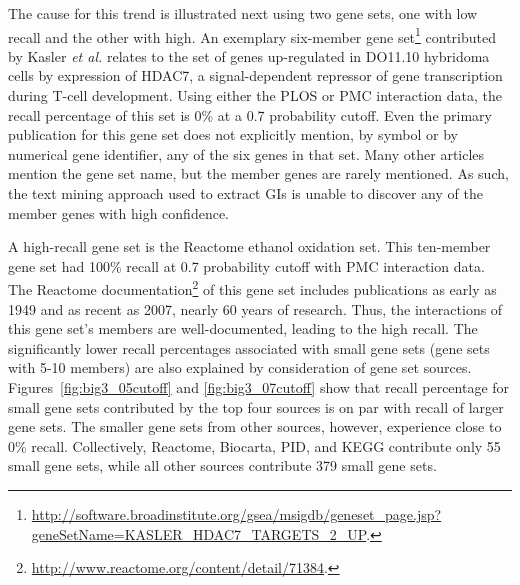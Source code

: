 \documentclass{ws-procs11x85}
\begin{document}
The cause for this trend is illustrated next using two gene sets, one with low recall and the other with high. An exemplary six-member gene set\footnote{\url{http://software.broadinstitute.org/gsea/msigdb/geneset\_page.jsp?geneSetName=KASLER\_HDAC7\_TARGETS\_2\_UP}.} contributed by Kasler \textit{et al.} relates to the set of genes up-regulated in DO11.10 hybridoma cells by expression of HDAC7, a signal-dependent repressor of gene transcription during T-cell development.  Using either the PLOS or PMC interaction data, the recall percentage of this set is 0\% at a 0.7 probability cutoff.  Even the primary publication \cite{Kasler2007} for this gene set does not explicitly mention, by symbol or by numerical gene identifier, any of the six genes in that set.  Many other articles mention the gene set name, but the member genes are rarely mentioned.  As such, the text mining approach used to extract GIs is unable to discover any of the member genes with high confidence.

A high-recall gene set is the Reactome ethanol oxidation set. This ten-member gene set had 100\% recall at 0.7 probability cutoff with PMC interaction data.  The Reactome documentation\footnote{\url{http://www.reactome.org/content/detail/71384}.} of this gene set includes publications as early as 1949 and as recent as 2007, nearly 60 years of research. Thus, the interactions of this gene set's members are well-documented, leading to the high recall.  
The significantly lower recall percentages associated with small gene sets (gene sets with 5-10 members) are also explained by consideration of gene set sources.  Figures~\ref{fig:big3_05cutoff} and \ref{fig:big3_07cutoff} show that recall percentage for small gene sets contributed by the top four sources is on par with recall of larger gene sets.  The smaller gene sets from other sources, however, experience close to 0\% recall.   Collectively, Reactome, Biocarta, PID, and KEGG contribute only 55 small gene sets, while all other sources contribute 379 small gene sets. %
\end{document}
